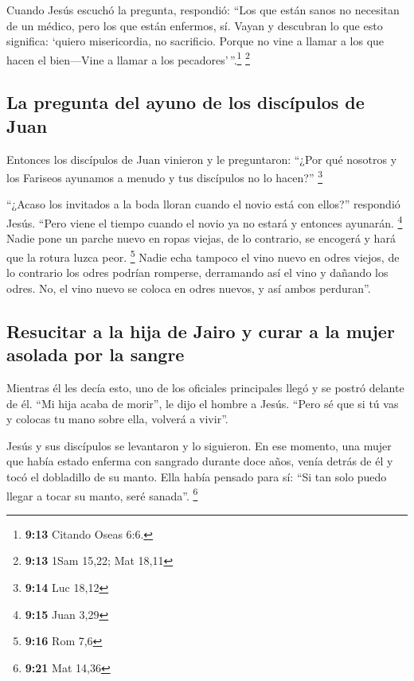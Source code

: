  Cuando Jesús escuchó la pregunta, respondió: ``Los que
están sanos no necesitan de un médico, pero los que están enfermos, sí.
 Vayan y descubran lo que esto significa: `quiero
misericordia, no sacrificio. Porque no vine a llamar a los que hacen el
bien---Vine a llamar a los pecadores'\,''.\footnote{\textbf{9:13}
  Citando Oseas 6:6.} \footnote{\textbf{9:13} 1Sam 15,22; Mat 18,11}

\hypertarget{la-pregunta-del-ayuno-de-los-discuxedpulos-de-juan}{%
\subsection{La pregunta del ayuno de los discípulos de
Juan}\label{la-pregunta-del-ayuno-de-los-discuxedpulos-de-juan}}

 Entonces los discípulos de Juan vinieron y le
preguntaron: ``¿Por qué nosotros y los Fariseos ayunamos a menudo y tus
discípulos no lo hacen?'' \footnote{\textbf{9:14} Luc 18,12}

 ``¿Acaso los invitados a la boda lloran cuando el novio
está con ellos?'' respondió Jesús. ``Pero viene el tiempo cuando el
novio ya no estará y entonces ayunarán. \footnote{\textbf{9:15} Juan
  3,29}  Nadie pone un parche nuevo en ropas viejas, de
lo contrario, se encogerá y hará que la rotura luzca peor. \footnote{\textbf{9:16}
  Rom 7,6}  Nadie echa tampoco el vino nuevo en odres
viejos, de lo contrario los odres podrían romperse, derramando así el
vino y dañando los odres. No, el vino nuevo se coloca en odres nuevos, y
así ambos perduran''.

\hypertarget{resucitar-a-la-hija-de-jairo-y-curar-a-la-mujer-asolada-por-la-sangre}{%
\subsection{Resucitar a la hija de Jairo y curar a la mujer asolada por
la
sangre}\label{resucitar-a-la-hija-de-jairo-y-curar-a-la-mujer-asolada-por-la-sangre}}

 Mientras él les decía esto, uno de los oficiales
principales llegó y se postró delante de él. ``Mi hija acaba de morir'',
le dijo el hombre a Jesús. ``Pero sé que si tú vas y colocas tu mano
sobre ella, volverá a vivir''.

 Jesús y sus discípulos se levantaron y lo siguieron.
 En ese momento, una mujer que había estado enferma con
sangrado durante doce años, venía detrás de él y tocó el dobladillo de
su manto.  Ella había pensado para sí: ``Si tan solo
puedo llegar a tocar su manto, seré sanada''. \footnote{\textbf{9:21}
  Mat 14,36}

